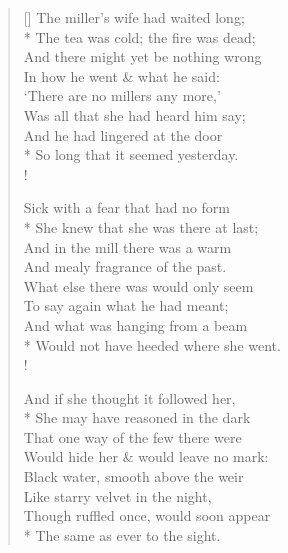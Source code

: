 \documentclass[MAIN]{subfiles}
\begin{document}
\settowidth{\versewidth}{And there might yet be nothing wrong}
\begin{verse}[\versewidth]
The miller's wife had waited long;\\*
\vin The tea was cold; the fire was dead;\\
And there might yet be nothing wrong\\
\vin In how he went \& what he said:\\
`There are no millers any more,'\\
\vin Was all that she had heard him say;\\
And he had lingered at the door\\*
\vin So long that it seemed yesterday.\\!

Sick with a fear that had no form\\*
\vin She knew that she was there at last;\\
And in the mill there was a warm\\
\vin And mealy fragrance of the past.\\
What else there was would only seem\\
\vin To say again what he had meant;\\
And what was hanging from a beam\\*
\vin Would not have heeded where she went.\\!

And if she thought it followed her,\\*
\vin She may have reasoned in the dark\\
That one way of the few there were\\
\vin Would hide her \& would leave no mark:\\
Black water, smooth above the weir\\
\vin Like starry velvet in the night,\\
Though ruffled once, would soon appear\\*
\vin The same as ever to the sight.
\end{verse}
\end{document}
